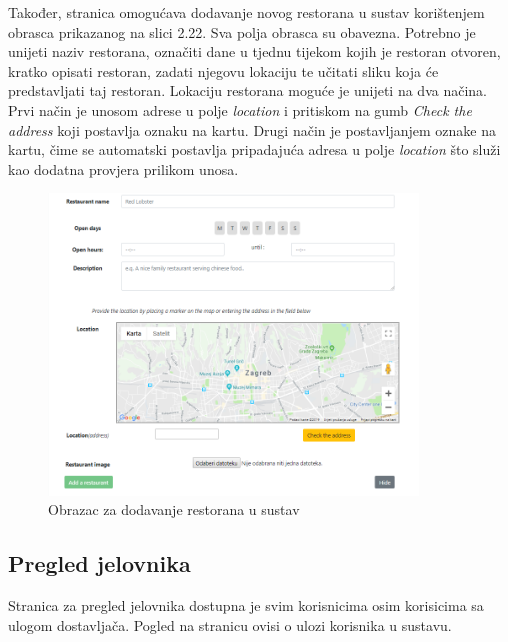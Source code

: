 \documentclass[times, utf8, zavrsni, numeric]{fer}
\begin{document}
Također, stranica omogućava dodavanje novog restorana u sustav korištenjem obrasca prikazanog na slici 2.22. Sva polja obrasca su obavezna. Potrebno je unijeti naziv restorana, označiti dane u tjednu tijekom kojih je restoran otvoren, kratko opisati restoran, zadati njegovu lokaciju te učitati sliku koja će predstavljati taj restoran. Lokaciju restorana moguće je unijeti na dva načina. Prvi način je unosom adrese u polje \emph{location} i pritiskom na gumb \emph{Check the address} koji postavlja oznaku na kartu. Drugi način je postavljanjem oznake na kartu, čime se automatski postavlja pripadajuća adresa u polje \emph{location} što služi kao dodatna provjera prilikom unosa.
\begin{figure}[htb]
\centering
\includegraphics[height=8.0cm]{restoranObrazac.png}
\caption{Obrazac za dodavanje restorana u sustav}
\label{fig:obrRest}
\end{figure}
\subsection{Pregled jelovnika}
Stranica za pregled jelovnika dostupna je svim korisnicima osim korisicima sa ulogom dostavljača. Pogled na stranicu ovisi o ulozi korisnika u sustavu. 
\end{document}
